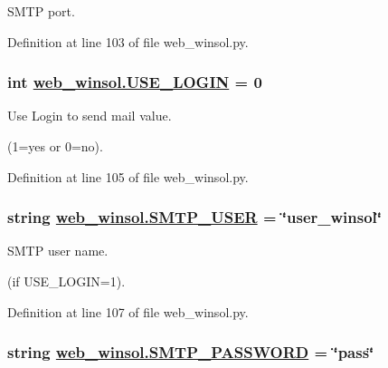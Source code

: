 SMTP port. 



Definition at line 103 of file web\_\-winsol.py.\hypertarget{namespaceweb__winsol_b8f70f09ea48dbef657f6d4df67709df}{
\subsubsection[USE\_\-LOGIN]{\setlength{\rightskip}{0pt plus 5cm}int \hyperlink{namespaceweb__winsol_b8f70f09ea48dbef657f6d4df67709df}{web\_\-winsol.USE\_\-LOGIN} = 0}}
\label{namespaceweb__winsol_b8f70f09ea48dbef657f6d4df67709df}


Use Login to send mail value. 

(1=yes or 0=no). 

Definition at line 105 of file web\_\-winsol.py.\hypertarget{namespaceweb__winsol_d8d68eb9b49c5d54eec61ede319ce34e}{
\subsubsection[SMTP\_\-USER]{\setlength{\rightskip}{0pt plus 5cm}string \hyperlink{namespaceweb__winsol_d8d68eb9b49c5d54eec61ede319ce34e}{web\_\-winsol.SMTP\_\-USER} = \char`\"{}user\_\-winsol\char`\"{}}}
\label{namespaceweb__winsol_d8d68eb9b49c5d54eec61ede319ce34e}


SMTP user name. 

(if USE\_\-LOGIN=1). 

Definition at line 107 of file web\_\-winsol.py.\hypertarget{namespaceweb__winsol_679bd8bf37d7fe61b45e3b7943bf3f90}{
\subsubsection[SMTP\_\-PASSWORD]{\setlength{\rightskip}{0pt plus 5cm}string \hyperlink{namespaceweb__winsol_679bd8bf37d7fe61b45e3b7943bf3f90}{web\_\-winsol.SMTP\_\-PASSWORD} = \char`\"{}pass\char`\"{}}}
\label{namespaceweb__winsol_679bd8bf37d7fe61b45e3b7943bf3f90}


